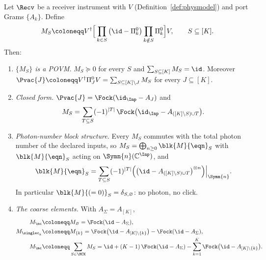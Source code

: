 \begin{theorem}\label{thm:click-povm}
Let $\Recv$ be a receiver instrument with  $V$
(Definition~\ref{def:physmodel}) and port Grams $\{A_k\}$. Define
\begin{equation}\label{eq:MSdef}
  M_S\coloneqq V^\dagger\Big[\prod_{k\in S}\big(\id-\Pi^0_k\big)
  \prod_{k\notin S}\Pi^0_k\Big]V ,\qquad S\subseteq[K].
\end{equation}
Then:
\begin{enumerate}[label=(\roman*),leftmargin=3.0em]
\item \emph{$\{M_S\}$ is a POVM.} $M_S\succeq0$ for every $S$ and
  $\sum_{S\subseteq[K]}M_S=\id$. Moreover
  $\Pvac{J}\coloneqq V^\dagger\Pi^0_JV=\sum_{S\subseteq[K]\setminus J}M_S$ for
  every $J\subseteq[K]$.
\item \emph{Closed form.} $\Pvac{J}=\Fock(\id_{\Inp}-A_J)$ and
  \begin{equation}\label{eq:incexc}
    M_S=\sum_{T\subseteq S}(-1)^{|T|}\,
        \Fock\big(\id_{\Inp}-A_{([K]\setminus S)\cup T}\big).
  \end{equation}
\item \emph{Photon-number block structure.} Every $M_S$ commutes with the total
  photon number of the declared inputs, so
  $M_S=\bigoplus_{n\ge0}\blk{M}{\eqn}_S$ with
  $\blk{M}{\eqn}_S$ acting on $\Symn{n}(\mathbb{C}^{\Inp})$, and
  \begin{equation}\label{eq:blockMS}
    \blk{M}{\eqn}_S=\sum_{T\subseteq S}(-1)^{|T|}
    \Big(\big(\id-A_{([K]\setminus S)\cup T}\big)^{\otimes n}\Big)
    \Big|_{\Symn{n}} .
  \end{equation}
  In particular $\blk{M}{(=0)}_S=\delta_{S,\varnothing}$: no photon, no click.
\item \emph{The coarse elements.} With $A_\Sigma=A_{[K]}$,
  \begin{align}
    M_{\nc}&\coloneqq M_{\varnothing}=\Fock(\id-A_\Sigma),
      \label{eq:Mnc}\\
    M_{\singlec_k}&\coloneqq M_{\{k\}}
      =\Fock\big(\id-A_{[K]\setminus\{k\}}\big)-\Fock(\id-A_\Sigma),
      \label{eq:Msc}\\
    M_{\mc}&\coloneqq\sum_{S\in\MCK}M_S
      =\id+(K-1)\,\Fock(\id-A_\Sigma)
        -\sum_{k=1}^{K}\Fock\big(\id-A_{[K]\setminus\{k\}}\big).
      \label{eq:Mmc}
  \end{align}
\end{enumerate}
\end{theorem}

